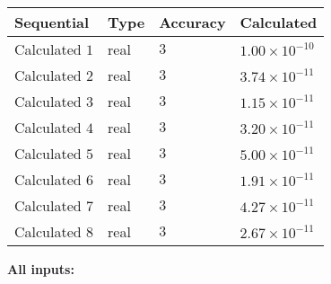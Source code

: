 \documentclass[12pt]{article}
\begin{document}
   
   
   
\noindent{}
   
   
  
  
\noindent\begin{tabular}{|l|l|l|l|}
\hline
 Sequential & Type & Accuracy & Calculated \\ 
\hline
 
 
  Calculated $           1$ & real & $           3 $ & 
 $ 1.00 \times 10^{-10} $ 
 \\  \hline  
 
 
  Calculated $           2$ & real & $           3 $ & 
 $ 3.74 \times 10^{-11} $ 
 \\  \hline  
 
 
  Calculated $           3$ & real & $           3 $ & 
 $ 1.15 \times 10^{-11} $ 
 \\  \hline  
 
 
  Calculated $           4$ & real & $           3 $ & 
 $ 3.20 \times 10^{-11} $ 
 \\  \hline  
 
 
  Calculated $           5$ & real & $           3 $ & 
 $ 5.00 \times 10^{-11} $ 
 \\  \hline  
 
 
  Calculated $           6$ & real & $           3 $ & 
 $ 1.91 \times 10^{-11} $ 
 \\  \hline  
 
 
  Calculated $           7$ & real & $           3 $ & 
 $ 4.27 \times 10^{-11} $ 
 \\  \hline  
 
 
  Calculated $           8$ & real & $           3 $ & 
 $ 2.67 \times 10^{-11} $ 
 \\  \hline  
 \end{tabular}
   
   
   
   
\noindent\vspace{0.1in}\hspace{-0.08in} {\textbf{\Large{All inputs: }}}
   
   
  
\end{document}
